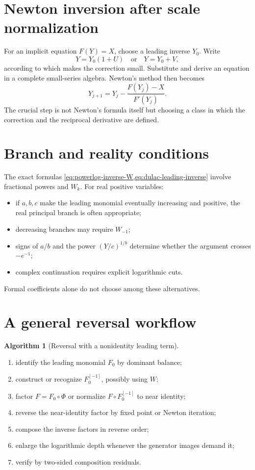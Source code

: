 \documentclass[11pt,openany]{book}
\theoremstyle{definition}
\newtheorem{algorithm}{Algorithm}[chapter]
\theoremstyle{plain}
\theoremstyle{remark}
\newcommand{\invcomp}{^{[-1]}}
\begin{document}
\section{Newton inversion after scale normalization}
For an implicit equation \(F(Y)=X\), choose a leading inverse \(Y_0\). Write
\[
 Y=Y_0(1+U)
 \quad\text{or}\quad
 Y=Y_0+V,
\]
according to which makes the correction small. Substitute and derive an equation in a complete small-series algebra. Newton's method then becomes
\begin{equation}\label{eq:newton-implicit}
 Y_{j+1}=Y_j-\frac{F(Y_j)-X}{F'(Y_j)}.
\end{equation}
The crucial step is not Newton's formula itself but choosing a class in which the correction and the reciprocal derivative are defined.

\section{Branch and reality conditions}
The exact formulas \cref{eq:powerlog-inverse-W,eq:dulac-leading-inverse} involve fractional powers and \(W_k\). For real positive variables:
\begin{itemize}
\item if \(a,b,c\) make the leading monomial eventually increasing and positive, the real principal branch is often appropriate;
\item decreasing branches may require \(W_{-1}\);
\item signs of \(a/b\) and the power \((Y/c)^{1/b}\) determine whether the argument crosses \(-e^{-1}\);
\item complex continuation requires explicit logarithmic cuts.
\end{itemize}
Formal coefficients alone do not choose among these alternatives.

\section{A general reversal workflow}
\begin{algorithm}[Reversal with a nonidentity leading term]\label{alg:general-reversal}
\begin{enumerate}
\item identify the leading monomial \(F_0\) by dominant balance;
\item construct or recognize \(F_0\invcomp\), possibly using \(W\);
\item factor \(F=F_0\circ\Phi\) or normalize \(F\circ F_0\invcomp\) to near identity;
\item reverse the near-identity factor by fixed point or Newton iteration;
\item compose the inverse factors in reverse order;
\item enlarge the logarithmic depth whenever the generator images demand it;
\item verify by two-sided composition residuals.
\end{enumerate}
\end{algorithm}
\end{document}
